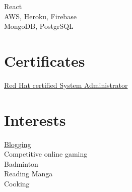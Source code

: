 \documentclass[]{Kushagra-build}
\begin{document}
\begin{minipage}[t]{0.29\textwidth}
React \\

AWS, Heroku, Firebase \\
MongoDB, PostgrSQL \\

\sectionsep

\section{Certificates}
\href{https://rhtapps.redhat.com/certifications/badge/verify/JBADVLBCAISWJFM6KOGIYCQ6PYAEQU3CUPSQX2KSDXT6RW46LQ3T7ULZ55KZZ56SKO7EQ3ETTLYZQ4U5NQYTCNA62RUWOCM34WWBUYQ=}{Red Hat certified System Administrator} \\
\sectionsep


\section{Interests}
    \href{https://dev.to/kushagra_mehta}{Blogging} \\
    Competitive online gaming \\
    Badminton \\
    Reading Manga \\
    Cooking \\
\sectionsep



\sectionsep
{}

%
%
\end{minipage} 
\hfill
\end{document}
